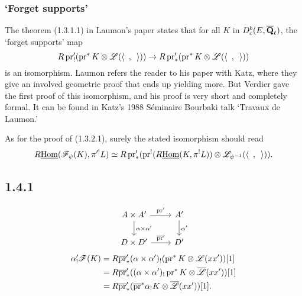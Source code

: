 \documentclass[deligne.tex]{subfiles}
\begin{document}
\subsubsection*{`Forget supports'}
The theorem (1.3.1.1) in Laumon's paper states that for all $K$ in
$D_c^b(E,\overline{\mathbf{Q}}_\ell)$, the `forget supports' map
\begin{equation*}
	R\operatorname{pr}_!'(\operatorname{pr}^*K\otimes\mathscr L(\langle\enskip,\enskip\rangle))
	\rightarrow R\operatorname{pr}_*'(\operatorname{pr}^*K\otimes\mathscr L(\langle\enskip,\enskip\rangle))
\end{equation*}
is an isomorphism. Laumon refers the reader to his paper with Katz, where
they give an involved geometric proof that ends up yielding more.
But Verdier gave the first proof of this isomorphism, and his proof is very
short and completely formal. It can be found in Katz's 1988 Séminaire
Bourbaki talk `Travaux de Laumon.'

As for the proof of (1.3.2.1), surely the stated isomorphism should read
\begin{equation*}
	R\underline{\operatorname{Hom}}(\mathscr F_{\psi}(K),\pi'^!L)
	\simeq R\operatorname{pr}_*'(\operatorname{pr}^!(R\underline{\operatorname{Hom}}(K,\pi^!L))\otimes\mathscr L_{\psi^{-1}}(\langle\enskip,\enskip\rangle)).
\end{equation*}

\subsection*{1.4.1}
\begin{equation*}\begin{tikzcd}
	A\times A'\arrow[r,"\pr'"]\arrow[d,"\alpha\times\alpha'"]
	&A'\arrow[d,"\alpha'"] \\
	D\times D'\arrow[r,"\overline\pr'"]&D'
\end{tikzcd}\end{equation*}
\begin{align*}
	\alpha_!'\mathscr F(K)
	&=R\overline{\operatorname{pr}}'_*(\alpha\times\alpha')_!(\operatorname{pr}^*K\otimes\mathscr L(xx'))[1]
\\	&=R\overline{\operatorname{pr}}'_*((\alpha\times\alpha')_!\operatorname{pr}^*K\otimes \overline{\mathscr L}(xx'))[1]
\\	&=R\overline{\operatorname{pr}}'_*(\overline{\operatorname{pr}}^*\alpha_!K\otimes \overline{\mathscr L}(xx'))[1].
\end{align*}
\end{document}
